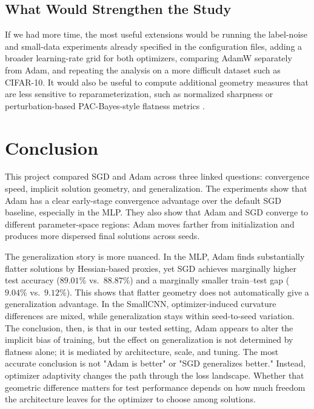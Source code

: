\documentclass[11pt]{article}
\begin{document}
\subsection{What Would Strengthen the Study}

If we had more time, the most useful extensions would be running the label-noise and small-data experiments already specified in the configuration files, adding a broader learning-rate grid for both optimizers, comparing AdamW separately from Adam, and repeating the analysis on a more difficult dataset such as CIFAR-10. It would also be useful to compute additional geometry measures that are less sensitive to reparameterization, such as normalized sharpness or perturbation-based PAC-Bayes-style flatness metrics \cite{neyshabur2017exploring}.

\section{Conclusion}

This project compared SGD and Adam across three linked questions: convergence speed, implicit solution geometry, and generalization. The experiments show that Adam has a clear early-stage convergence advantage over the default SGD baseline, especially in the MLP. They also show that Adam and SGD converge to different parameter-space regions: Adam moves farther from initialization and produces more dispersed final solutions across seeds.

The generalization story is more nuanced. In the MLP, Adam finds substantially flatter solutions by Hessian-based proxies, yet SGD achieves marginally higher test accuracy ($89.01\%$ vs.\ $88.87\%$) and a marginally smaller train--test gap ($9.04\%$ vs.\ $9.12\%$). This shows that flatter geometry does not automatically give a generalization advantage. In the SmallCNN, optimizer-induced curvature differences are mixed, while generalization stays within seed-to-seed variation. The conclusion, then, is that in our tested setting, Adam appears to alter the implicit bias of training, but the effect on generalization is not determined by flatness alone; it is mediated by architecture, scale, and tuning. The most accurate conclusion is not "Adam is better" or "SGD generalizes better." Instead, optimizer adaptivity changes the path through the loss landscape. Whether that geometric difference matters for test performance depends on how much freedom the architecture leaves for the optimizer to choose among solutions.
\end{document}
